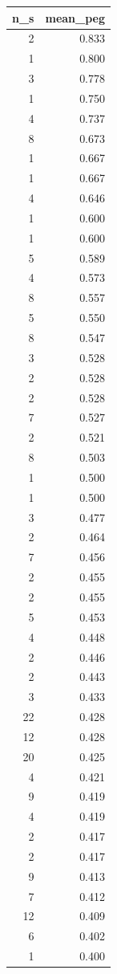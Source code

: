 \begin{tabular}{rr}
\toprule
n_s & mean_peg \\
\midrule
2 & 0.833 \\
1 & 0.800 \\
3 & 0.778 \\
1 & 0.750 \\
4 & 0.737 \\
8 & 0.673 \\
1 & 0.667 \\
1 & 0.667 \\
4 & 0.646 \\
1 & 0.600 \\
1 & 0.600 \\
5 & 0.589 \\
4 & 0.573 \\
8 & 0.557 \\
5 & 0.550 \\
8 & 0.547 \\
3 & 0.528 \\
2 & 0.528 \\
2 & 0.528 \\
7 & 0.527 \\
2 & 0.521 \\
8 & 0.503 \\
1 & 0.500 \\
1 & 0.500 \\
3 & 0.477 \\
2 & 0.464 \\
7 & 0.456 \\
2 & 0.455 \\
2 & 0.455 \\
5 & 0.453 \\
4 & 0.448 \\
2 & 0.446 \\
2 & 0.443 \\
3 & 0.433 \\
22 & 0.428 \\
12 & 0.428 \\
20 & 0.425 \\
4 & 0.421 \\
9 & 0.419 \\
4 & 0.419 \\
2 & 0.417 \\
2 & 0.417 \\
9 & 0.413 \\
7 & 0.412 \\
12 & 0.409 \\
6 & 0.402 \\
1 & 0.400 \\

\end{tabular}
